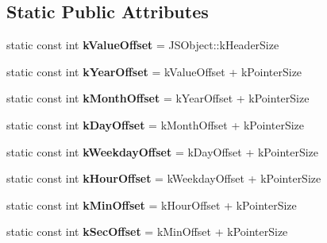 \subsection*{Static Public Attributes}
\begin{DoxyCompactItemize}
\item 
static const int {\bfseries k\+Value\+Offset} = J\+S\+Object\+::k\+Header\+Size\hypertarget{classv8_1_1internal_1_1_j_s_date_a42f62e74380a2fde764c5efe7605e0c7}{}\label{classv8_1_1internal_1_1_j_s_date_a42f62e74380a2fde764c5efe7605e0c7}

\item 
static const int {\bfseries k\+Year\+Offset} = k\+Value\+Offset + k\+Pointer\+Size\hypertarget{classv8_1_1internal_1_1_j_s_date_ac70d435cc4b8043aea093053d814b711}{}\label{classv8_1_1internal_1_1_j_s_date_ac70d435cc4b8043aea093053d814b711}

\item 
static const int {\bfseries k\+Month\+Offset} = k\+Year\+Offset + k\+Pointer\+Size\hypertarget{classv8_1_1internal_1_1_j_s_date_a871a1beff8b50dde5806d2c0c6d99a51}{}\label{classv8_1_1internal_1_1_j_s_date_a871a1beff8b50dde5806d2c0c6d99a51}

\item 
static const int {\bfseries k\+Day\+Offset} = k\+Month\+Offset + k\+Pointer\+Size\hypertarget{classv8_1_1internal_1_1_j_s_date_a18c495bfb324c1fc0291bcaa90dd4955}{}\label{classv8_1_1internal_1_1_j_s_date_a18c495bfb324c1fc0291bcaa90dd4955}

\item 
static const int {\bfseries k\+Weekday\+Offset} = k\+Day\+Offset + k\+Pointer\+Size\hypertarget{classv8_1_1internal_1_1_j_s_date_a524c26a7e64b392e0867f4a8765ad569}{}\label{classv8_1_1internal_1_1_j_s_date_a524c26a7e64b392e0867f4a8765ad569}

\item 
static const int {\bfseries k\+Hour\+Offset} = k\+Weekday\+Offset + k\+Pointer\+Size\hypertarget{classv8_1_1internal_1_1_j_s_date_ae21c9b039f413f20a28fabc87d7fdb7f}{}\label{classv8_1_1internal_1_1_j_s_date_ae21c9b039f413f20a28fabc87d7fdb7f}

\item 
static const int {\bfseries k\+Min\+Offset} = k\+Hour\+Offset + k\+Pointer\+Size\hypertarget{classv8_1_1internal_1_1_j_s_date_a3f1f64a3808e921e2a4b1c550f24861b}{}\label{classv8_1_1internal_1_1_j_s_date_a3f1f64a3808e921e2a4b1c550f24861b}

\item 
static const int {\bfseries k\+Sec\+Offset} = k\+Min\+Offset + k\+Pointer\+Size\hypertarget{classv8_1_1internal_1_1_j_s_date_ad65d0f71fce7a37d4195b695b27152fc}{}\label{classv8_1_1internal_1_1_j_s_date_ad65d0f71fce7a37d4195b695b27152fc}


\end{DoxyCompactItemize}
